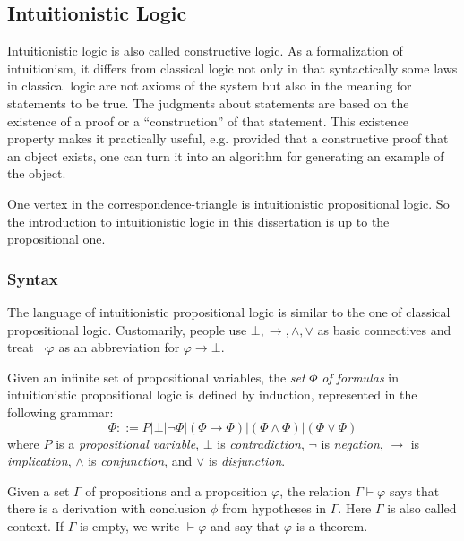 \subsection{Intuitionistic Logic}
\label{sec:bg_il}
Intuitionistic logic is also called constructive logic. As a formalization of intuitionism, it differs from classical logic not only in that syntactically some laws in classical logic are not axioms of the system but also in the meaning for statements to be true. The judgments about statements are based on the existence of a proof or a ``construction'' of that statement. This existence property makes it practically useful, e.g. provided that a constructive proof that an object exists, one can turn it into an algorithm for generating an example of the object.

One vertex in the correspondence-triangle is intuitionistic propositional logic. So the introduction to intuitionistic logic in this dissertation is up to the propositional one.

\subsubsection{Syntax}
\label{sec:bg_il_s}
The language of intuitionistic propositional logic is similar to the one of classical propositional logic. Customarily, people use $ \bot , \to , \land , \lor $ as basic connectives and treat $ \neg \varphi $ as an abbreviation for $ \varphi \to \bot $.

\begin{definition}
Given an infinite set of propositional variables, the \emph{set} $ \Phi $ \emph{of formulas} in intuitionistic propositional logic is defined by induction, represented in the following grammar:
\[
\Phi ::= P | \bot | \neg \Phi | ( \Phi \to \Phi ) | ( \Phi \land \Phi ) | ( \Phi \lor \Phi )
\]
where $ P $ is a \emph{propositional variable}, $ \bot $ is \emph{contradiction}, $ \neg $ is \emph{negation}, $ \to $ is \emph{implication}, $ \land $ is \emph{conjunction}, and $ \lor $ is \emph{disjunction}.
\end{definition}

Given a set $ \Gamma $ of propositions and a proposition $ \varphi $, the relation $ \Gamma \vdash \varphi $ says that there is a derivation with conclusion $ \phi $ from hypotheses in $ \Gamma $. Here $ \Gamma $ is also called context. If $ \Gamma $ is empty, we write $ \vdash \varphi $ and say that $ \varphi $ is a theorem.


